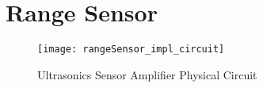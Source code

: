 \graphicspath{{content/4_implementation/figures/}}
\section{Range Sensor}

\begin{figure}[!htb]
  \centering
  \texttt{[image: rangeSensor\_impl\_circuit]}
  \caption{Ultrasonics Sensor Amplifier Physical Circuit}
\end{figure}